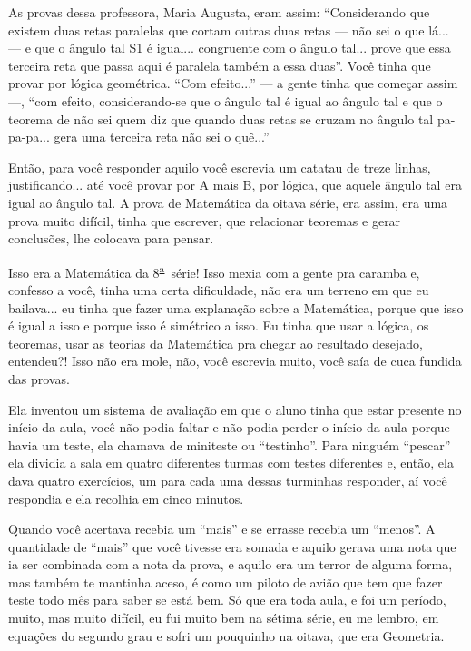 \documentclass{hipatia}
\newcommand{\superau}{\textsuperscript{\underline{a}}~}
\begin{document}
As provas dessa professora, Maria Augusta, eram assim: ``Considerando
que existem duas retas paralelas que cortam outras duas retas --- não sei
o que lá... --- e que o ângulo tal S1 é igual... congruente com o ângulo
tal... prove que essa terceira reta que passa aqui é paralela também a
essa duas''. Você tinha que provar por lógica geométrica. ``Com
efeito...'' --- a gente tinha que começar assim ---, ``com efeito,
considerando-se que o ângulo tal é igual ao ângulo tal e que o teorema
de não sei quem diz que quando duas retas se cruzam no ângulo tal
pa-pa-pa... gera uma terceira reta não sei o quê...''

Então, para você responder aquilo você escrevia um catatau de treze
linhas, justificando... até você provar por A mais B, por lógica, que
aquele ângulo tal era igual ao ângulo tal. A prova de Matemática da
oitava série, era assim, era uma prova muito difícil, tinha que
escrever, que relacionar teoremas e gerar conclusões, lhe colocava para
pensar.

Isso era a Matemática da 8\superau  série! Isso mexia com a gente pra caramba e,
confesso a você, tinha uma certa dificuldade, não era um terreno em que
eu bailava... eu tinha que fazer uma explanação sobre a Matemática,
porque que isso é igual a isso e porque isso é simétrico a isso. Eu
tinha que usar a lógica, os teoremas, usar as teorias da Matemática pra
chegar ao resultado desejado, entendeu?! Isso não era mole, não, você
escrevia muito, você saía de cuca fundida das provas.

Ela inventou um sistema de avaliação em que o aluno tinha que estar
presente no início da aula, você não podia faltar e não podia perder o
início da aula porque havia um teste, ela chamava de miniteste ou
``testinho''. Para ninguém ``pescar'' ela dividia a sala em quatro
diferentes turmas com testes diferentes e, então, ela dava quatro
exercícios, um para cada uma dessas turminhas responder, aí você
respondia e ela recolhia em cinco minutos.

Quando você acertava recebia um ``mais'' e se errasse recebia um
``menos''. A quantidade de ``mais'' que você tivesse era somada e aquilo
gerava uma nota que ia ser combinada com a nota da prova, e aquilo era
um terror de alguma forma, mas também te mantinha aceso, é como um
piloto de avião que tem que fazer teste todo mês para saber se está bem.
Só que era toda aula, e foi um período, muito, mas muito difícil, eu fui
muito bem na sétima série, eu me lembro, em equações do segundo grau e
sofri um pouquinho na oitava, que era Geometria.
\end{document}
